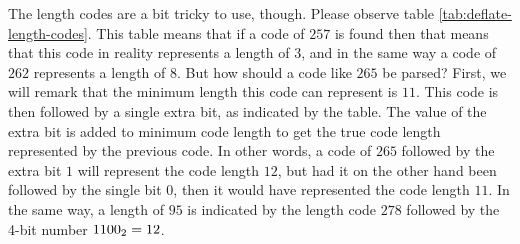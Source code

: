 The length codes are a bit tricky to use, though. Please observe table
\ref{tab:deflate-length-codes}. This table means that if a code of
$257$ is found then that means that this code in reality represents a
length of $3$, and in the same way a code of $262$ represents a length
of $8$. But how should a code like $265$ be parsed? First, we will
remark that the minimum length this code can represent is $11$. This
code is then followed by a single extra bit, as indicated by the
table. The value of the extra bit is added to minimum code length to
get the true code length represented by the previous code. In other
words, a code of $265$ followed by the extra bit $1$ will represent
the code length $12$, but had it on the other hand been followed by
the single bit $0$, then it would have represented the code length
$11$. In the same way, a length of $95$ is indicated by the length
code $278$ followed by the 4-bit number $\mbox{\ensuremath{1100_2}}=12$.

